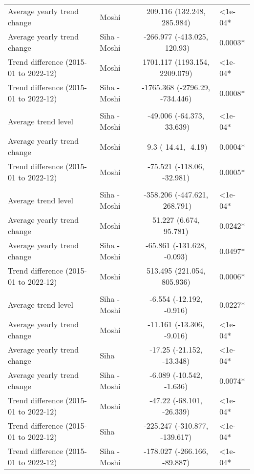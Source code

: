\begin{longtable}{l|lcl}
Average yearly trend change & Moshi & 209.116 (132.248, 285.984) & <1e-04* \\ 
Average yearly trend change & Siha - Moshi & -266.977 (-413.025, -120.93) & 0.0003* \\ 
Trend difference (2015-01 to 2022-12) & Moshi & 1701.117 (1193.154, 2209.079) & <1e-04* \\ 
Trend difference (2015-01 to 2022-12) & Siha - Moshi & -1765.368 (-2796.29, -734.446) & 0.0008* \\ 
\midrule\addlinespace[2.5pt]
\multicolumn{4}{l}{Trauma} \\[2.5pt] 
\midrule\addlinespace[2.5pt]
Average trend level & Siha - Moshi & -49.006 (-64.373, -33.639) & <1e-04* \\ 
Average yearly trend change & Moshi & -9.3 (-14.41, -4.19) & 0.0004* \\ 
Trend difference (2015-01 to 2022-12) & Moshi & -75.521 (-118.06, -32.981) & 0.0005* \\ 
\midrule\addlinespace[2.5pt]
\multicolumn{4}{l}{Urinary Infections} \\[2.5pt] 
\midrule\addlinespace[2.5pt]
Average trend level & Siha - Moshi & -358.206 (-447.621, -268.791) & <1e-04* \\ 
Average yearly trend change & Moshi & 51.227 (6.674, 95.781) & 0.0242* \\ 
Average yearly trend change & Siha - Moshi & -65.861 (-131.628, -0.093) & 0.0497* \\ 
Trend difference (2015-01 to 2022-12) & Moshi & 513.495 (221.054, 805.936) & 0.0006* \\ 
\midrule\addlinespace[2.5pt]
\multicolumn{4}{l}{Vector-borne Infections} \\[2.5pt] 
\midrule\addlinespace[2.5pt]
Average trend level & Siha - Moshi & -6.554 (-12.192, -0.916) & 0.0227* \\ 
Average yearly trend change & Moshi & -11.161 (-13.306, -9.016) & <1e-04* \\ 
Average yearly trend change & Siha & -17.25 (-21.152, -13.348) & <1e-04* \\ 
Average yearly trend change & Siha - Moshi & -6.089 (-10.542, -1.636) & 0.0074* \\ 
Trend difference (2015-01 to 2022-12) & Moshi & -47.22 (-68.101, -26.339) & <1e-04* \\ 
Trend difference (2015-01 to 2022-12) & Siha & -225.247 (-310.877, -139.617) & <1e-04* \\ 
Trend difference (2015-01 to 2022-12) & Siha - Moshi & -178.027 (-266.166, -89.887) & <1e-04* \\ 

\end{longtable}

